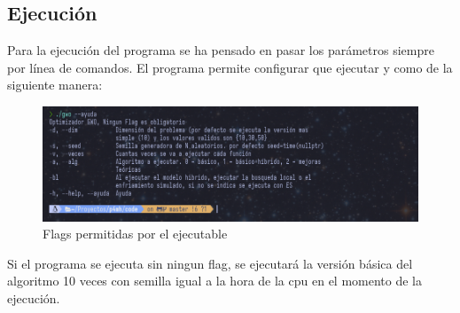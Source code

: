 \documentclass[a4paper]{report}
\begin{document}
\subsection{Ejecución}

Para la ejecución del programa se ha pensado en pasar los parámetros siempre por línea de comandos. El programa permite configurar que ejecutar y como de la siguiente manera:

\begin{figure}[H]
    \centering
    \caption{Flags permitidas por el ejecutable}
    \includegraphics[width=\textwidth]{dash_help_program.png}


\end{figure}

Si el programa se ejecuta sin ningun flag, se ejecutará la versión básica del algoritmo 10 veces con semilla igual a la hora de la cpu en el momento de la ejecución.




\end{document}
